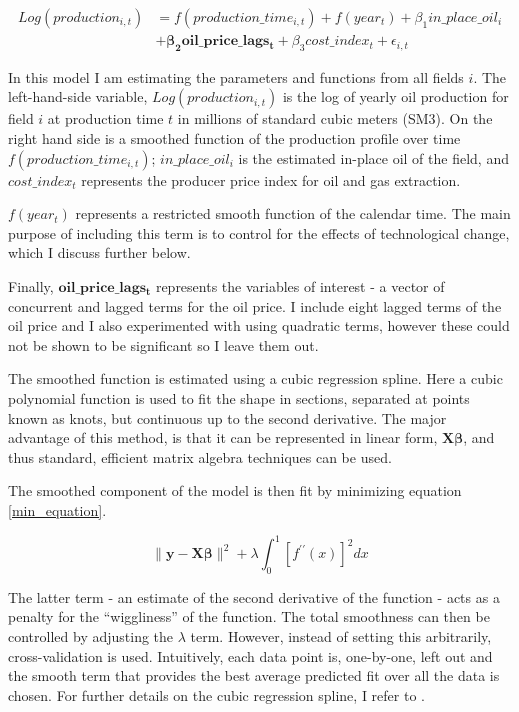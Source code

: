 \documentclass[12pt]{article}
\begin{document}
\begin{equation}
\begin{split}
	Log(production_{i,t}) & = f(production\_time_{i,t}) + f(year_t) + \beta_1 in\_place\_oil_{i}\\
	 \quad & + \mathbf{\beta_2 oil\_price\_lags_t} + 
	 \beta_3 cost\_index_{t}  +  
	  \epsilon_{i,t}
\label{gam_price_eqn}
\end{split}
\end{equation}

In this model I am estimating the parameters and functions from all fields $i$. The left-hand-side variable, $Log(production_{i,t})$ is the log of yearly oil production for field $i$ at production time $t$ in millions of standard cubic meters (SM3).  On the right hand side is a smoothed function of the production profile over time $f(production\_time_{i,t})$; $in\_place\_oil_{i}$ is the estimated in-place oil of the field, and $cost\_index_{t}$ represents the producer price index for oil and gas extraction. 

$f(year_t)$ represents a restricted smooth function of the calendar time.  The main purpose of including this term is to control for the effects of technological change, which I discuss further below.

Finally, $\mathbf{oil\_price\_lags_t}$ represents the variables of interest - a vector of concurrent and lagged terms for the oil price. I include eight lagged terms of the oil price and I also experimented with using quadratic terms, however these could not be shown to be significant so I leave them out. 

The smoothed function is estimated using a cubic regression spline. Here a cubic polynomial function is used to fit the shape in sections, separated at points known as knots, but continuous up to the second derivative.  The major advantage of this method, is that it can be represented in linear form, $\boldsymbol{X \beta} $, and thus standard, efficient matrix algebra techniques can be used.  

The smoothed component of the model is then fit by minimizing equation \ref{min_equation}.

\begin{equation}
\| \mathbf{y} - \mathbf{X\beta} \| ^2 + \lambda \int_{0}^{1} [f^{\prime \prime}(x)]^2 dx
\label{min_equation}
\end{equation}

The latter term - an estimate of the second derivative of the function - acts as a penalty for the ``wiggliness'' of the function. The total smoothness can then be controlled by adjusting the $\lambda$ term. However, instead of setting this arbitrarily, cross-validation is used. Intuitively, each data point is, one-by-one, left out and the smooth term that provides the best average predicted fit over all the data is chosen.  For further details on the cubic regression spline, I refer to \citet{wood_generalized_2006}.
\end{document}
